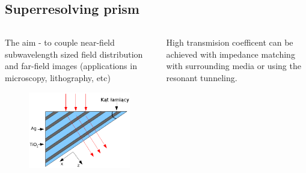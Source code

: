 \documentclass{beamer}
\begin{document}
\subsection{Superresolving prism}
\begin{frame}
	\begin{columns}
		\begin{column}{0.5\textwidth}
			The aim - to couple near-field subwavelength sized field distribution and far-field images (applications in microscopy, lithography, etc)
			\begin{figure}[htb]
				\includegraphics[width=\textwidth]{../images/multilayer/prism.png}
			\end{figure}
		\end{column}
		\begin{column}{0.5\textwidth}
		High transmision coefficent can be achieved with impedance matching with surrounding media or using the resonant tunneling.

			{\tiny \cite{scalora-transparentmetal}}
		\end{column}
	\end{columns}
		
\end{frame}
\end{document}
